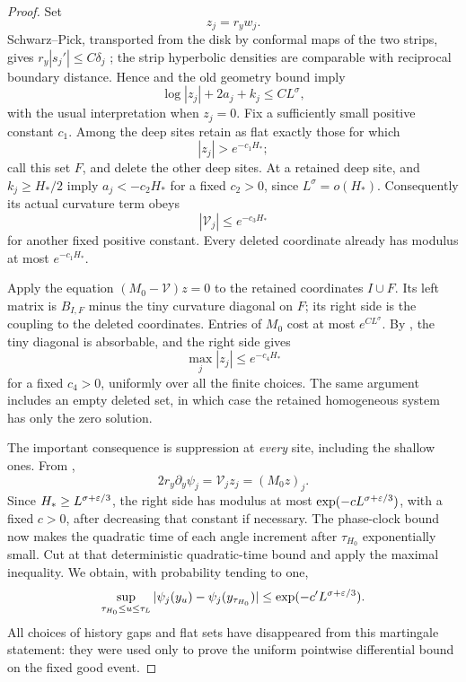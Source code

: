 \begin{proof}
Set
\[
 z_j=r_y w_j.
\]
Schwarz--Pick, transported from the disk by conformal maps of the two
strips, gives \(r_y|s_j'|\le C\delta_j\)
\cite[Chapter~I, Lemma~1.2]{Garnett2007}; the strip hyperbolic densities
are comparable with reciprocal boundary distance.  Hence
 and the old geometry bound imply
\begin{equation}
 \log|z_j|+2a_j+k_j\le C L^\sigma,
 \label{odd:Schwarz-suppression}
\end{equation}
with the usual interpretation when \(z_j=0\).
Fix a sufficiently small positive constant \(c_1\).  Among the deep sites
retain as flat exactly those for which
\[
 |z_j|>e^{-c_1H_*};
\]
call this set \(F\), and delete the other deep sites.  At a retained deep
site,  and \(k_j\ge H_*/2\) imply
\(a_j<-c_2H_*\) for a fixed \(c_2>0\), since \(L^\sigma=o(H_*)\).
Consequently its actual curvature term obeys
\[
 |\mathcal V_j|\le e^{-c_3H_*}
\]
for another fixed positive constant.  Every deleted coordinate already
has modulus at most \(e^{-c_1H_*}\).

Apply the equation \((M_0-\mathcal V)z=0\) to the retained coordinates
\(I\cup F\).  Its left matrix is \(B_{I,F}\) minus the tiny curvature
diagonal on \(F\); its right side is the coupling to the deleted
coordinates.  Entries of \(M_0\) cost at most \(e^{CL^\sigma}\).
By , the tiny diagonal is absorbable, and the
right side gives
\begin{equation}
 \max_j|z_j|\le e^{-c_4H_*}
 \label{odd:all-sites-suppressed}
\end{equation}
for a fixed \(c_4>0\), uniformly over all the finite choices.  The same
argument includes an empty deleted set, in which case the retained
homogeneous system has only the zero solution.

The important consequence is suppression at \emph{every} site, including
the shallow ones.  From ,
\begin{equation}
 2r_y\partial_y\psi_j
      =\mathcal V_j z_j=(M_0z)_j.
 \label{odd:all-angle-suppression}
\end{equation}
Since \(H_*\ge L^{\sigma+\varepsilon/3}\), the right side has modulus at most
\(\exp(-cL^{\sigma+\varepsilon/3})\), with a fixed \(c>0\), after decreasing
that constant if necessary.  The phase-clock bound now makes the quadratic
time of each angle increment after \(\tau_{H_0}\) exponentially small.
Cut at that deterministic quadratic-time bound and apply the maximal
inequality.  We obtain, with probability tending to one,
\begin{equation}
 \sup_{\tau_{H_0}\le u\le\tau_L}
   |\psi_j(y_u)-\psi_j(y_{\tau_{H_0}})|
        \le \exp(-c' L^{\sigma+\varepsilon/3}).
 \label{odd:late-angle-increments}
\end{equation}
All choices of history gaps and flat sets have disappeared from this
martingale statement: they were used only to prove the uniform pointwise
differential bound on the fixed good event.


\end{proof}
